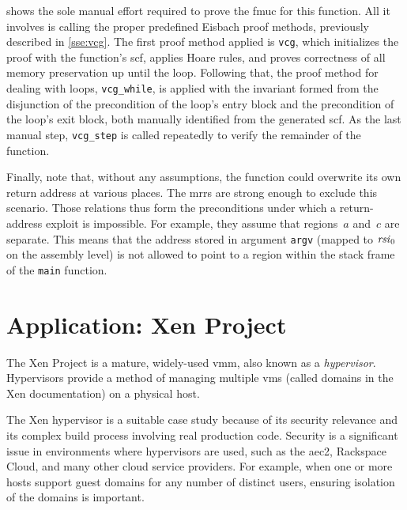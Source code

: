  shows the sole manual effort required
to prove the \ac{fmuc} for this function.
All it involves is calling the proper predefined Eisbach proof methods,
previously described in \cref{sse:vcg}.
The first proof method applied is \lstinline|vcg|,
which initializes the proof with the function's \ac{scf}, applies Hoare rules,
and proves correctness of all memory preservation up until the loop.
Following that, the proof method for dealing with loops, \lstinline|vcg_while|,
is applied with the invariant formed from the disjunction
of the precondition of the loop's entry block
and the precondition of the loop's exit block,
both manually identified from the generated \ac{scf}.
As the last manual step, \lstinline|vcg_step| is called repeatedly
to verify the remainder of the function.

Finally, note that, without any assumptions,
the function could overwrite its own return address at various places.
The \acp{mrr} are strong enough to exclude this scenario.
Those relations thus form the preconditions
under which a return-address exploit is impossible.%
For example, they assume that regions~$a$ and~$c$ are separate.
This means that the address stored in argument \lstinline[style=C]|argv|
(mapped to $\mathit{rsi}_0$ on the assembly level)
is not allowed to point to a region
within the stack frame of the \lstinline[style=C]|main| function.

\section{Application: Xen Project}\label{se:xen}
The Xen Project \autocite{chisnall2008definitive}%
is a mature, widely-used \ac{vmm}, also known as a \emph{hypervisor}.%
Hypervisors provide a method of managing multiple
\acp{vm} (called domains in the Xen documentation) on a physical host.%

The Xen hypervisor is a suitable case study because of its security relevance%
and its complex build process involving real production code.
Security is a significant issue in environments where hypervisors are used,
such as the \ac{aec2}, Rackspace Cloud, and many other cloud service providers.
For example, when one or more hosts support guest domains
for any number of distinct users,
ensuring isolation of the domains is important.

